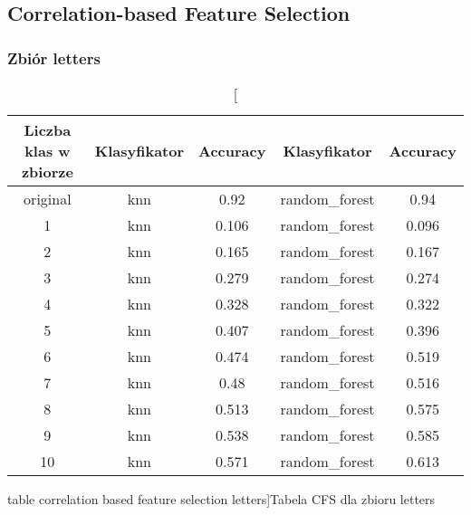 \documentclass{classrep}
\begin{document}
{{        }

        \subsection{Correlation-based Feature Selection} {
            \subsubsection{Zbiór letters} {
                \begin{table}[!htbp]
                    \centering
                    \begin{tabular}{|c|c|c|c|c|}
                        \hline
                        Liczba klas w zbiorze & Klasyfikator & Accuracy & Klasyfikator & Accuracy \\ \hline
                        original & knn & 0.92 & random\_forest & 0.94 \\ \hline
                        1 & knn & 0.106 & random\_forest & 0.096 \\ \hline
                        2 & knn & 0.165 & random\_forest & 0.167 \\ \hline
                        3 & knn & 0.279 & random\_forest & 0.274 \\ \hline
                        4 & knn & 0.328 & random\_forest & 0.322 \\ \hline
                        5 & knn & 0.407 & random\_forest & 0.396 \\ \hline
                        6 & knn & 0.474 & random\_forest & 0.519 \\ \hline
                        7 & knn & 0.48 & random\_forest & 0.516 \\ \hline
                        8 & knn & 0.513 & random\_forest & 0.575 \\ \hline
                        9 & knn & 0.538 & random\_forest & 0.585 \\ \hline
                        10 & knn & 0.571 & random\_forest & 0.613 \\ \hline
                    \end{tabular}
                    \caption
                    [table correlation based feature selection letters]{Tabela CFS dla
                    zbioru letters}
                    \label{table_correlation_based_feature_selection_letters}
                \end{table}
                \FloatBarrier
            }
}}
\end{document}
